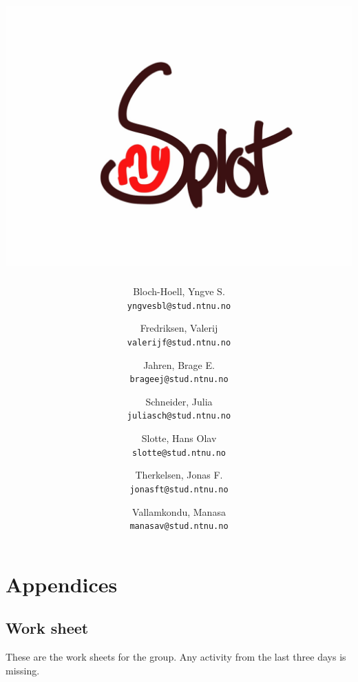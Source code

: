 \documentclass[11pt]{report}
\begin{document}
\begin{titlepage}
\title{\includegraphics[width=0.8\linewidth]{./img/frontpagelogo.jpg}}
\author{
	Bloch-Hoell, Yngve S.\\
	\texttt{yngvesbl@stud.ntnu.no}
	\and
	Fredriksen, Valerij\\
	\texttt{valerijf@stud.ntnu.no}
	\and
	Jahren, Brage E.\\
	\texttt{brageej@stud.ntnu.no}
	\and
	Schneider, Julia\\
	\texttt{juliasch@stud.ntnu.no}
	\and
	Slotte, Hans Olav\\
	\texttt{slotte@stud.ntnu.no}
	\and
	Therkelsen, Jonas F.\\
	\texttt{jonasft@stud.ntnu.no}
	\and
	Vallamkondu, Manasa\\
	\texttt{manasav@stud.ntnu.no}
}
\maketitle
\end{titlepage}


\tableofcontents





\part{Appendices}

\appendix




\chapter{Work sheet}

These are the work sheets for the group. Any activity from the last three days is missing.



\end{document}
